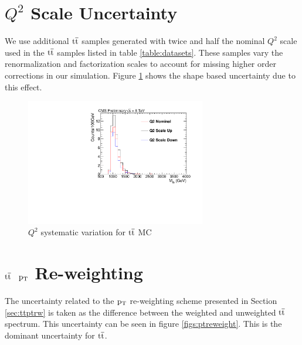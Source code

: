 
\section{$Q^2$ Scale Uncertainty}
We use additional $\mathrm{t\overline{t}}$ samples generated with twice and half the nominal $Q^2$ 
scale used in the $\mathrm{t\overline{t}}$ samples listed in table \ref{table:datasets}.  These samples vary the renormalization and factorization scales to account for 
missing higher order corrections in our simulation.  Figure \ref{figs:q2scale} shows the shape based uncertainty due to this effect.

\begin{figure}[htcb]
\begin{center}
\includegraphics[width=0.7\textwidth]{AN-13-004/figs/TTbar_Q2Scale}
\caption{
$Q^2$ systematic variation for $\mathrm{t\overline{t}}$ MC 
}
\label{figs:q2scale}
\end{center}
\end{figure}

\section{$\mathrm{t\overline{t}}$ $\mathrm{p_{T}}$ Re-weighting}
The uncertainty related to the $\mathrm{p_{T}}$ re-weighting scheme presented in Section \ref{sec:ttptrw} is taken as the difference between the weighted and unweighted $\mathrm{t\overline{t}}$ spectrum.
This uncertainty can be seen in figure \ref{figs:ptreweight}.  This is the dominant uncertainty for $\mathrm{t\overline{t}}$. 

